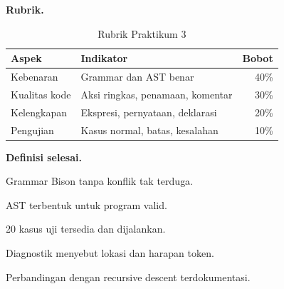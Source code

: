 \textbf{Rubrik.}
\begin{table}[H]
\centering
\caption{Rubrik Praktikum 3}
\label{tab:ch13-rubrik}
\begin{tabularx}{\textwidth}{@{}lXr@{}}
\toprule
\textbf{Aspek} & \textbf{Indikator} & \textbf{Bobot} \\
\midrule
Kebenaran & Grammar dan AST benar & 40\% \\
Kualitas kode & Aksi ringkas, penamaan, komentar & 30\% \\
Kelengkapan & Ekspresi, pernyataan, deklarasi & 20\% \\
Pengujian & Kasus normal, batas, kesalahan & 10\% \\
\bottomrule
\end{tabularx}
\end{table}

\textbf{Definisi selesai.}
\begin{checklist}
  \item Grammar Bison tanpa konflik tak terduga.
  \item AST terbentuk untuk program valid.
  \item 20 kasus uji tersedia dan dijalankan.
  \item Diagnostik menyebut lokasi dan harapan token.
  \item Perbandingan dengan recursive descent terdokumentasi.
\end{checklist}
